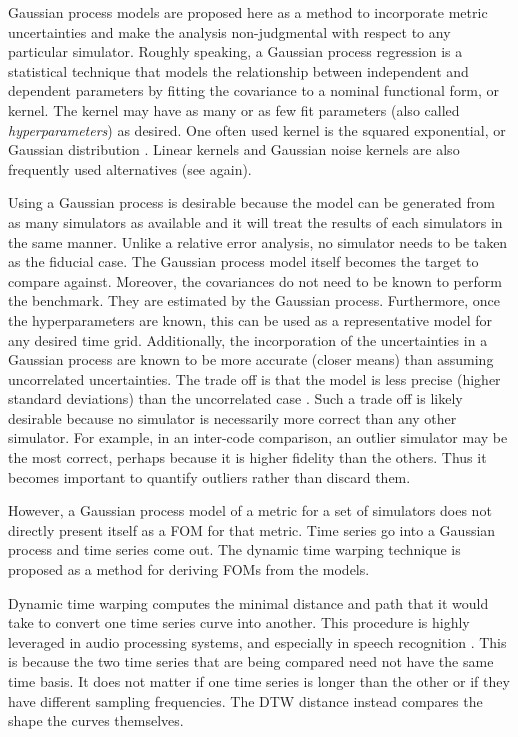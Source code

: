 Gaussian process models are proposed here as a method to incorporate 
metric uncertainties and make the analysis non-judgmental with respect to 
any particular
simulator. Roughly speaking, a Gaussian process regression is a 
statistical technique
that models the relationship between independent and dependent parameters
by fitting the covariance to a nominal functional form, or kernel.
The kernel may have as many or as few fit parameters (also called 
\emph{hyperparameters}) as desired. One often used kernel is the squared 
exponential, or Gaussian distribution \cite{rasmussen2006gaussian,hodlr}. 
Linear kernels and Gaussian noise kernels are also frequently used 
alternatives (see \cite{rasmussen2006gaussian,hodlr} again). 

Using a Gaussian process is desirable because the model can be generated
from as many simulators as available and it will treat the results of
each simulators in the same manner. Unlike a relative error analysis, no 
simulator needs to be taken as the fiducial case. The Gaussian process model 
itself becomes the target to compare against. 
Moreover, the covariances do not need to be known to perform the benchmark.
They are estimated by the Gaussian process. Furthermore, once the 
hyperparameters are known, this can be used as a representative model for 
any desired time grid. Additionally, the incorporation of the uncertainties
in a Gaussian process are known to be more accurate (closer means) than 
assuming uncorrelated uncertainties.  The trade off is that the 
model is less precise (higher standard deviations) than the uncorrelated 
case \cite{hodlr}. Such a trade off is likely desirable because no simulator 
is necessarily more correct than any other simulator. For example, 
in an inter-code comparison, an outlier simulator may be the 
most correct, perhaps because it is higher fidelity than the others. Thus it
becomes important to quantify outliers rather than discard them.

However, a Gaussian process model of a metric for a set of simulators 
does not directly present itself as a FOM for that metric. Time series go 
into a Gaussian process and time series come out. The dynamic time warping 
technique is proposed as a method for deriving FOMs from the models.  

Dynamic time warping computes the minimal distance and path that it would 
take to convert one time series curve into another. This procedure is highly 
leveraged in audio processing systems, and especially in speech recognition
\cite{myers1980performance,muda2010voice}.
This is because the two time series that are being compared need not have
the same time basis.  It does not matter if one time series is longer than 
the other or if they have different sampling frequencies. The DTW distance
instead compares the shape the curves themselves. 

